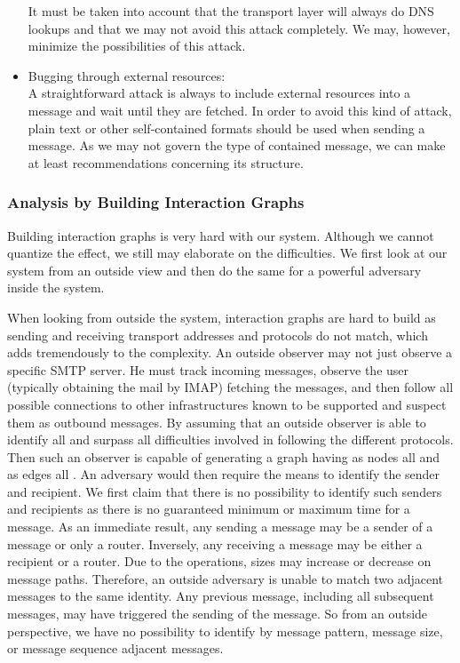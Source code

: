 \begin{itemize}
	It must be taken into account that the transport layer will always do DNS lookups and that we may not avoid this attack completely. We may, however, minimize the possibilities of this attack.
	
	\item Bugging through external resources:\\
	A straightforward attack is always to include external resources into a message and wait until they are fetched. In order to avoid this kind of attack, plain text or other self-contained formats should be used when sending a message. As we may not govern the type of contained message, we can make at least recommendations concerning its structure.
\end{itemize}

\subsubsection{Analysis by Building Interaction Graphs\label{sec:analysisInteractionGraphs}}
Building interaction graphs is very hard with our system. Although we cannot quantize the effect, we still may elaborate on the difficulties. We first look at our system from an outside view and then do the same for a powerful adversary inside the system.

When looking from outside the system, interaction graphs are hard to build as sending and receiving transport addresses and protocols do not match, which adds tremendously to the complexity. An outside observer may not just observe a specific SMTP server. He must track incoming messages, observe the user (typically obtaining the mail by IMAP) fetching the messages, and then follow all possible connections to other infrastructures known to be supported and suspect them as outbound messages. By assuming that an outside observer is able to identify all \VortexMessages{} and surpass all difficulties involved in following the different protocols. Then such an observer is capable of generating a graph having as nodes all \VortexNodes{} and as edges all \VortexMessages{}. An adversary would then require the means to identify the sender and recipient. We first claim that there is no possibility to identify such senders and recipients as there is no guaranteed minimum or maximum time for a message. As an immediate result, any \VortexNode{} sending a message may be a sender of a message or only a router. Inversely, any \VortexNode{} receiving a message may be either a recipient or a router. Due to the operations, sizes may increase or decrease on message paths. Therefore, an outside adversary is unable to match two adjacent messages to the same identity. Any previous message, including all subsequent messages, may have triggered the sending of the message. So from an outside perspective, we have no possibility to identify by message pattern, message size, or message sequence adjacent messages.

